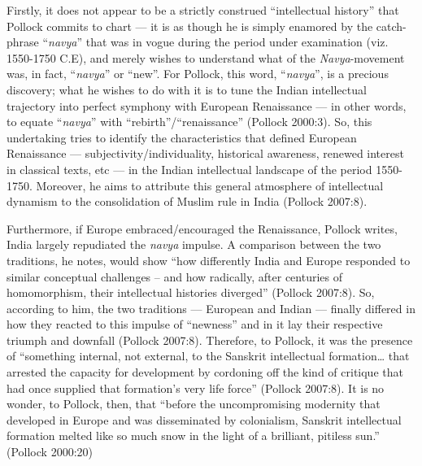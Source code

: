 Firstly, it does not appear to be a strictly construed “intellectual history” that Pollock commits to chart — it is as though he is simply enamored by the catch-phrase “{\sl navya}” that was in vogue during the period under examination (viz. 1550-1750 C.E), and merely wishes to understand what of the {\sl Navya}-movement was, in fact, “{\sl navya}” or “new”. For Pollock, this word, “{\sl navya}”, is a precious discovery; what he wishes to do with it is to tune the Indian intellectual trajectory into perfect symphony with European Renaissance — in other words, to equate “{\sl navya}” with “rebirth”/“renaissance” (Pollock 2000:3). So, this undertaking tries to identify the characteristics that defined European Renaissance — subjectivity/individuality, historical awareness, renewed interest in classical texts, etc — in the Indian intellectual landscape of the period 1550-1750. Moreover, he aims to attribute this general atmosphere of intellectual dynamism to the consolidation of Muslim rule in India (Pollock 2007:8).

\newpage

Furthermore, if Europe embraced/encouraged the Renaissance, Pollock writes, India largely repudiated the {\sl navya} impulse. A comparison between the two traditions, he notes, would show “how differently India and Europe responded to similar conceptual challenges – and how radically, after centuries of homomorphism, their intellectual histories diverged” (Pollock 2007:8). So, according to him, the two traditions — European and Indian — finally differed in how they reacted to this impulse of “newness” and in it lay their respective triumph and downfall (Pollock 2007:8). Therefore, to Pollock, it was the presence of “something internal, not external, to the Sanskrit intellectual formation… that arrested the capacity for development by cordoning off the kind of critique that had once supplied that formation’s very life force” (Pollock 2007:8). It is no wonder, to Pollock, then, that “before the uncompromising modernity that developed in Europe and was disseminated by colonialism, Sanskrit intellectual formation melted like so much snow in the light of a brilliant, pitiless sun.” (Pollock 2000:20)

